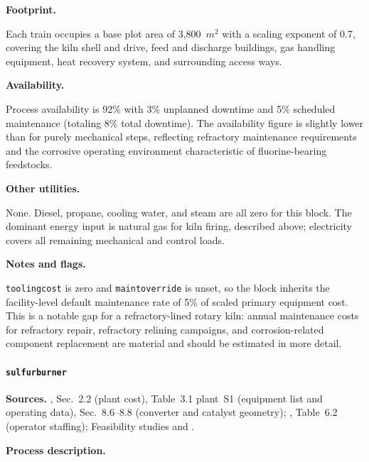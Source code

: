 \documentclass{article}
\renewcommand\_{\textunderscore\allowbreak}
\begin{document}
\medskip
\noindent\textbf{Footprint.}\quad

Each train occupies a base plot area of 3,800~$\si{m^2}$ with a scaling exponent of 0.7, covering the kiln shell and drive, feed and discharge buildings, gas handling equipment, heat recovery system, and surrounding access ways.

\medskip
\noindent\textbf{Availability.}\quad

Process availability is 92\% with 3\% unplanned downtime and 5\% scheduled maintenance (totaling 8\% total downtime). The availability figure is slightly lower than for purely mechanical steps, reflecting refractory maintenance requirements and the corrosive operating environment characteristic of fluorine-bearing feedstocks.

\medskip
\noindent\textbf{Other utilities.}\quad

None. Diesel, propane, cooling water, and steam are all zero for this block. The dominant energy input is natural gas for kiln firing, described above; electricity covers all remaining mechanical and control loads.


\medskip
\noindent\textbf{Notes and flags.}\quad

\texttt{tooling\_cost} is zero and \texttt{maint\_override} is unset, so the block inherits the facility-level default maintenance rate of 5\% of scaled primary equipment cost. This is a notable gap for a refractory-lined rotary kiln: annual maintenance costs for refractory repair, refractory relining campaigns, and corrosion-related component replacement are material and should be estimated in more detail.

\clearpage
\paragraph{\texttt{sulfur\_burner}}\label{app:04-methods-blockdefs-sulfurburner}\leavevmode\par
 
\medskip
\noindent\textbf{Sources.}\quad
\citet{davenportSulfuricAcidManufacture2006}, Sec.~2.2 (plant cost), Table~3.1 plant~S1 (equipment list and operating data), Sec.~8.6--8.8 (converter and catalyst geometry); \citet{mousavinezhadSustainableLithiumProduction2025}, \citet{ulrichChemicalEngineeringProcess2004} Table~6.2 (operator staffing); Feasibility studies \citet{sgscanadaincSK1300Technical2024} and \citet{rothFeasibilityStudyNational2022}.

\medskip
\noindent\textbf{Process description.}\quad
 
\end{document}
